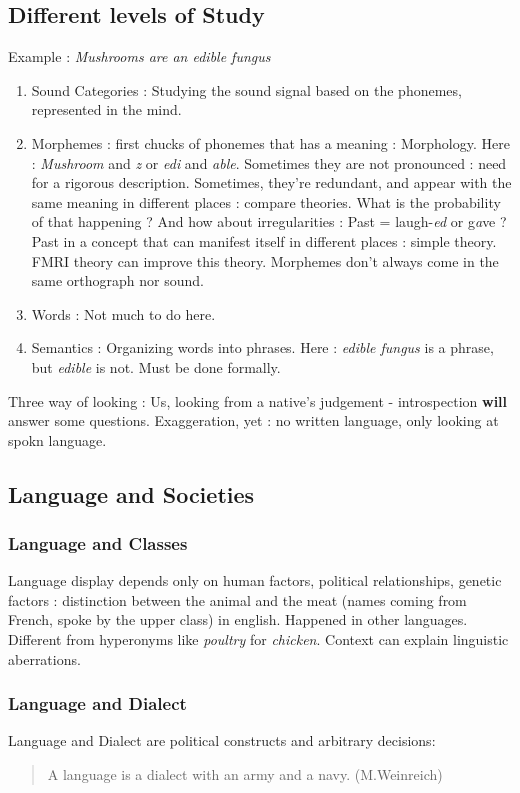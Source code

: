 \documentclass{cours}
\begin{document}
\subsection{Different levels of Study}
Example\! : \textsl{Mushrooms are an edible fungus}
\begin{enumerate}
    \item Sound Categories\! : Studying the sound signal based on the phonemes, represented in the mind.  
    \item Morphemes\! : first chucks of phonemes that has a meaning\! : Morphology. Here\! : \textsl{Mushroom} and \textsl{z} or \textsl{edi} and \textsl{able}. Sometimes they are not pronounced\! : need for a rigorous description. Sometimes, they're redundant, and appear with the same meaning in different places\! : compare theories. What is the probability of that happening ? And how about irregularities\! : Past = laugh-\textit{ed} or g\textit{a}ve ? Past in a concept that can manifest itself in different places\! : simple theory. FMRI theory can improve this theory. Morphemes don't always come in the same orthograph nor sound.
    \item Words\! : Not much to do here. 
    \item Semantics\! : Organizing words into phrases. Here\! : \textsl{edible fungus} is a phrase, but \textsl{edible} is not. Must be done formally.
\end{enumerate}
Three way of looking\! : Us, looking from a native's judgement - introspection \textbf{will} answer some questions. 
Exaggeration, yet\! : no written language, only looking at spokn language. 

\subsection{Language and Societies}
    \subsubsection{Language and Classes}
        Language display depends only on human factors, political relationships, genetic factors\! : distinction between the animal and the meat (names coming from French, spoke by the upper class) in english. Happened in other languages. Different from hyperonyms like \textit{poultry} for \textit{chicken}. Context can explain linguistic aberrations. 
    \subsubsection{Language and Dialect}
        Language and Dialect are political constructs and arbitrary decisions\!: \begin{quote}
            A language is a dialect with an army and a navy. (M.Weinreich)
        \end{quote} 
\end{document}
